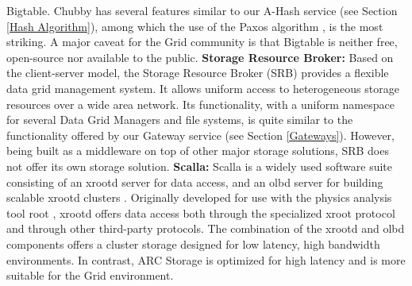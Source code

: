 \documentclass[final]{ieee}
\begin{document}
Bigtable. Chubby has several features similar to our A-Hash service (see Section \ref{Hash Algorithm}),
among which the use of the Paxos algorithm \cite{Paxos,PaxosLive}, is
the most striking. A major caveat for the Grid community is that
Bigtable is neither free, open-source nor available to the public.
\newline
\textbf{Storage Resource Broker:}  Based on the client-server model,
the Storage Resource Broker (SRB) \cite{earlySRB,SRB} provides a flexible data grid management
system. It allows  uniform access to heterogeneous
storage resources over a wide area network. %
Its functionality, with a uniform namespace for several Data Grid
Managers and file systems, is quite similar to the functionality
offered by our Gateway service (see Section \ref{Gateways}). However, being built as a middleware on top of
other major storage solutions, SRB does not offer its own storage solution.
\newline
\textbf{Scalla:} Scalla is a widely used software suite consisting of an
xrootd server for data access, and an olbd
server for building scalable xrootd clusters \cite{Scalla}. %
Originally developed for use with the physics analysis tool root \cite{root},
xrootd offers data access both through the specialized xroot protocol
and through other third-party protocols. The combination of the xrootd
and olbd components offers a cluster storage designed for low latency,
high bandwidth environments. In contrast, ARC Storage is optimized
for high latency and is more suitable for the Grid environment.

\end{document}
